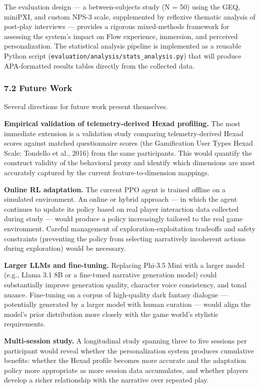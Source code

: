 The evaluation design --- a between-subjects study (N = 50) using the
GEQ, miniPXI, and custom NPS-3 scale, supplemented by reflexive thematic
analysis of post-play interviews --- provides a rigorous mixed-methods
framework for assessing the system's impact on Flow experience,
immersion, and perceived personalization. The statistical analysis
pipeline is implemented as a reusable Python script
(\texttt{evaluation/analysis/stats\_analysis.py}) that will produce
APA-formatted results tables directly from the collected data.

\subsubsection{7.2 Future Work}\label{future-work}

Several directions for future work present themselves.

\textbf{Empirical validation of telemetry-derived Hexad profiling.} The
most immediate extension is a validation study comparing
telemetry-derived Hexad scores against matched questionnaire scores (the
Gamification User Types Hexad Scale; Tondello et al., 2016) from the
same participants. This would quantify the construct validity of the
behavioral proxy and identify which dimensions are most accurately
captured by the current feature-to-dimension mappings.

\textbf{Online RL adaptation.} The current PPO agent is trained offline
on a simulated environment. An online or hybrid approach --- in which
the agent continues to update its policy based on real player
interaction data collected during study --- would produce a policy
increasingly tailored to the real game environment. Careful management
of exploration-exploitation tradeoffs and safety constraints (preventing
the policy from selecting narratively incoherent actions during
exploration) would be necessary.

\textbf{Larger LLMs and fine-tuning.} Replacing Phi-3.5 Mini with a
larger model (e.g., Llama 3.1 8B or a fine-tuned narrative generation
model) could substantially improve generation quality, character voice
consistency, and tonal nuance. Fine-tuning on a corpus of high-quality
dark fantasy dialogue --- potentially generated by a larger model with
human curation --- would align the model's prior distribution more
closely with the game world's stylistic requirements.

\textbf{Multi-session study.} A longitudinal study spanning three to
five sessions per participant would reveal whether the personalization
system produces cumulative benefits: whether the Hexad profile becomes
more accurate and the adaptation policy more appropriate as more session
data accumulates, and whether players develop a richer relationship with
the narrative over repeated play.

